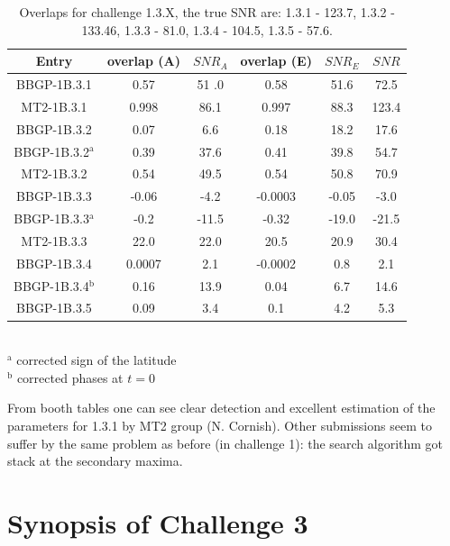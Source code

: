 \documentclass{iopart}
\begin{document}
\begin{table}
\caption{\label{EMRI2} Overlaps for challenge 1.3.X, the true SNR are: 1.3.1 - 123.7, 1.3.2 - 133.46, 1.3.3 - 81.0, 1.3.4 - 104.5, 1.3.5 - 57.6.} 
\begin{tabular}{|c|c|c|c|c|c|}
\hline
Entry & overlap (A) & $SNR_A$ &  overlap (E) & $SNR_E$ & $SNR$ \\
\hline
BBGP-1B.3.1 & 0.57 & 51 .0 & 0.58 & 51.6 & 72.5\\
MT2-1B.3.1  & 0.998 & 86.1 & 0.997 & 88.3 & 123.4\\
\hline
BBGP-1B.3.2 & 0.07 & 6.6 & 0.18 & 18.2 & 17.6\\
BBGP-1B.3.2$^\mathrm{a}$ & 0.39 & 37.6 & 0.41 & 39.8 & 54.7\\
MT2-1B.3.2  & 0.54 & 49.5 & 0.54 & 50.8 & 70.9 \\
\hline
BBGP-1B.3.3 & -0.06 & -4.2 & -0.0003 & -0.05 & -3.0 \\
BBGP-1B.3.3$^\mathrm{a}$ & -0.2 & -11.5 & -0.32 & -19.0 & -21.5\\
MT2-1B.3.3  & 22.0 &  22.0 & 20.5 & 20.9 & 30.4 \\
\hline
BBGP-1B.3.4 & 0.0007 & 2.1 & -0.0002 & 0.8 & 2.1\\
BBGP-1B.3.4$^\mathrm{b}$ & 0.16 & 13.9 & 0.04 & 6.7 & 14.6 \\ 
\hline
BBGP-1B.3.5 & 0.09 & 3.4 & 0.1 & 4.2 & 5.3\\
\hline
\end{tabular}\\
$^\mathrm{a}$ corrected sign of the latitude\\
$^\mathrm{b}$ corrected phases at $t=0$
\end{table}


From booth tables one can see clear detection and excellent estimation of the parameters for
1.3.1 by MT2 group (N. Cornish). Other submissions seem to suffer by the same problem as before (in challenge 1): the search algorithm got stack at the secondary maxima. 
 



\section{Synopsis of Challenge 3}
\label{s:challenge-3}
\end{document}
